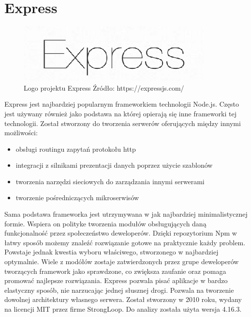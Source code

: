 \documentclass[12pt]{report}
\begin{document}
  \section{Express}
    \begin{figure}[!hb]
      \centering
      \includegraphics[width=\textwidth,height=\textheight,keepaspectratio]{logo_express.png} 
      \caption{Logo projektu Express \newline Źródło: https://expressjs.com/}
    \end{figure}
    Express jest najbardziej popularnym frameworkiem technologii Node.js.
    Często jest używany również jako podstawa na której opierają się inne frameworki tej technologii.
    Został stworzony do tworzenia serwerów oferujących między innymi możliwości:
    \begin{itemize}
      \item obsługi routingu zapytań protokołu http
      \item integracji z silnikami prezentacji danych poprzez użycie szablonów
      \item tworzenia narzędzi sieciowych do zarządzania innymi serwerami
      \item tworzenie pośredniczących mikroserwisów
    \end{itemize} 
    Sama podstawa frameworka jest utrzymywana w jak najbardziej minimalistycznej formie.
    Wspiera on polityke tworzenia modułów obsługujących daną funkcjonalność przez społeczeństwo deweloperów.
    Dzięki repozytorium Npm w łatwy sposób możemy znaleźć rozwiązanie gotowe na praktycznie każdy problem.
    Powstaje jednak kwestia wyboru właściwego, stworzonego w najbardziej optymalnie.
    Wiele z modółów zostaje zatwierdzonych przez grupe deweloperów tworzących framework jako sprawdzone, co zwiększa zaufanie oraz pomaga promować najlepsze rozwiązania.
    Express pozwala pisać aplikacje w bardzo elastyczny sposób, nie narzucając jednej słusznej drogi.
    Pozwala na tworzenie dowolnej architektury własnego serwera.
    Został stworzony w 2010 roku, wydany na licencji MIT przez firme StrongLoop.
    Do analizy została użyta wersja 4.16.3.
\end{document}
